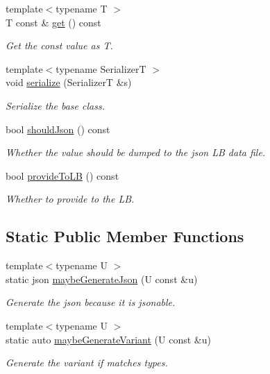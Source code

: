 \begin{DoxyCompactItemize}
{\footnotesize template$<$typename T $>$ }\\T const  \& \hyperlink{structvt_1_1vrt_1_1collection_1_1storage_1_1_store_elm_base_aee7baa6c42334cd792c76888cd07cc18}{get} () const
\begin{DoxyCompactList}\small\item\em Get the const value as {\ttfamily T}. \end{DoxyCompactList}\item 
{\footnotesize template$<$typename SerializerT $>$ }\\void \hyperlink{structvt_1_1vrt_1_1collection_1_1storage_1_1_store_elm_base_a6552c32f1795ca501635036adc4e21d7}{serialize} (SerializerT \&s)
\begin{DoxyCompactList}\small\item\em Serialize the base class. \end{DoxyCompactList}\item 
bool \hyperlink{structvt_1_1vrt_1_1collection_1_1storage_1_1_store_elm_base_add1ac8f8fa0142bebb916bfd0474cc16}{should\+Json} () const
\begin{DoxyCompactList}\small\item\em Whether the value should be dumped to the json LB data file. \end{DoxyCompactList}\item 
bool \hyperlink{structvt_1_1vrt_1_1collection_1_1storage_1_1_store_elm_base_ae28a8d2455a7429f43937fbe03249a4a}{provide\+To\+LB} () const
\begin{DoxyCompactList}\small\item\em Whether to provide to the LB. \end{DoxyCompactList}\end{DoxyCompactItemize}
\subsection*{Static Public Member Functions}
\begin{DoxyCompactItemize}
\item 
{\footnotesize template$<$typename U $>$ }\\static json \hyperlink{structvt_1_1vrt_1_1collection_1_1storage_1_1_store_elm_base_ad10346011cc11fffcfb52bf4b124f207}{maybe\+Generate\+Json} (U const \&u)
\begin{DoxyCompactList}\small\item\em Generate the json because it is jsonable. \end{DoxyCompactList}\item 
{\footnotesize template$<$typename U $>$ }\\static auto \hyperlink{structvt_1_1vrt_1_1collection_1_1storage_1_1_store_elm_base_a2da42349fb45cd9bc61c71073cf5dc76}{maybe\+Generate\+Variant} (U const \&u)
\begin{DoxyCompactList}\small\item\em Generate the variant if matches types. \end{DoxyCompactList}\end{DoxyCompactItemize}

